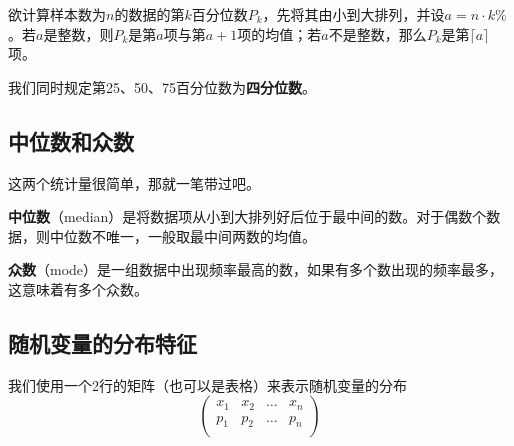 欲计算样本数为$n$的数据的第$k$百分位数$P_k$，先将其由小到大排列，并设$a=n\cdot k\%$。若$a$是整数，则$P_k$是第$a$项与第$a+1$项的均值；若$a$不是整数，那么$P_k$是第$\lceil a\rceil$项。

我们同时规定第25、50、75百分位数为\textbf{四分位数}。

\subsection{中位数和众数}
这两个统计量很简单，那就一笔带过吧。

\textbf{中位数}（median）是将数据项从小到大排列好后位于最中间的数。对于偶数个数据，则中位数不唯一，一般取最中间两数的均值。

\textbf{众数}（mode）是一组数据中出现频率最高的数，如果有多个数出现的频率最多，这意味着有多个众数。

\subsection{随机变量的分布特征}
我们使用一个2行的矩阵（也可以是表格）来表示随机变量的分布
\[\begin{pmatrix}
	x_1 & x_2 & \ldots & x_n \\
	p_1 & p_2 & \ldots & p_n \\
\end{pmatrix}\]

